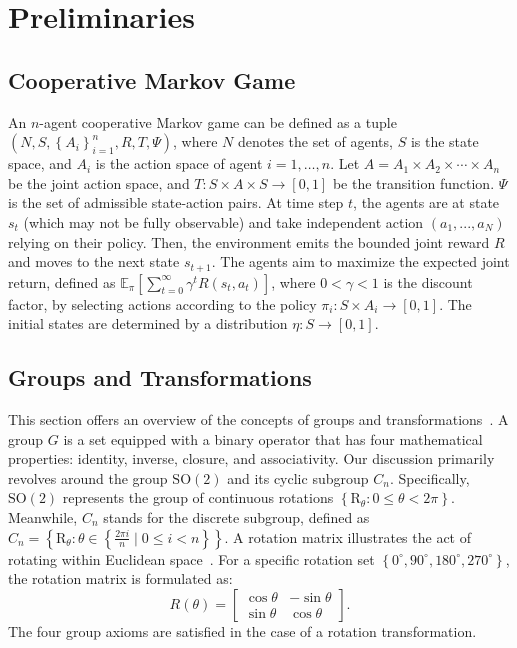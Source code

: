 \documentclass[letterpaper]{article} %
\theoremstyle{definition}
\begin{document}
\section{Preliminaries}

\subsection{Cooperative Markov Game}
An $n$-agent cooperative Markov game \cite{Boutilier96} can be defined as a tuple $(N,S,\left\{A_{i}\right\}_{i=1}^{n}, R, T,\Psi)$, where $N$ denotes the set of agents, $S$ is the state space, and $A_{i}$ is the action space of agent $ i=1, \ldots, n $. Let $A=A_{1} \times A_{2} \times \cdots \times A_{n}$ be the joint action space, and $T: S \times A \times S \rightarrow[0,1]$ be the transition function. $\Psi$ is the set of admissible state-action pairs. 
At time step $t$, the agents are at state $s_t$ (which may not be fully observable) and take independent action $(a_1,..., a_N)$ relying on their policy. Then, the environment emits the bounded joint reward $R$ and moves to the next state $s_{t+1}$.
The agents aim to maximize the expected joint return, defined as $\mathbb{E}_{\pi}\left[\sum_{t=0}^{\infty} \gamma^t R\left(s_t, a_t\right)\right]$, where $0<\gamma<1$ is the discount factor, by selecting actions according to the policy $\pi_{i}:{S} \times{A}_{i} \rightarrow[0,1]$. The initial states are determined by a distribution $\eta:{S} \rightarrow[0,1]$.

\subsection{Groups and Transformations}
This section offers an overview of the concepts of groups and transformations~\cite{bros}. A group $G$ is a set equipped with a binary operator that has four mathematical properties: identity, inverse, closure, and associativity. Our discussion primarily revolves around the group $ \mathrm{SO}(2) $ and its cyclic subgroup $ C_n $. Specifically, $ \mathrm{SO}(2) $ represents the group of continuous rotations  $ \left\{\mathrm{R}_\theta: 0 \leq \theta < 2 \pi \right\} $. Meanwhile, $ C_n $ stands for the discrete subgroup, defined as $ C_n=\left\{\mathrm{R}_\theta: \theta \in \left\{\frac{2 \pi i}{n} \mid 0 \leq i < n \right\} \right\} $. A rotation matrix illustrates the act of rotating within Euclidean space~\cite{rotationm}.  For a specific rotation set $\left\{0^{\circ}, 90^{\circ}, 180^{\circ}, 270^{\circ}\right\}$, the rotation matrix is formulated as:
\begin{equation*}
    R(\theta)=\left[\begin{array}{cc}\cos \theta & -\sin \theta \\ \sin \theta & \cos \theta\end{array}\right]\label{rotation1}.
\end{equation*}
The four group axioms are satisfied in the case of a rotation transformation. 
\end{document}
